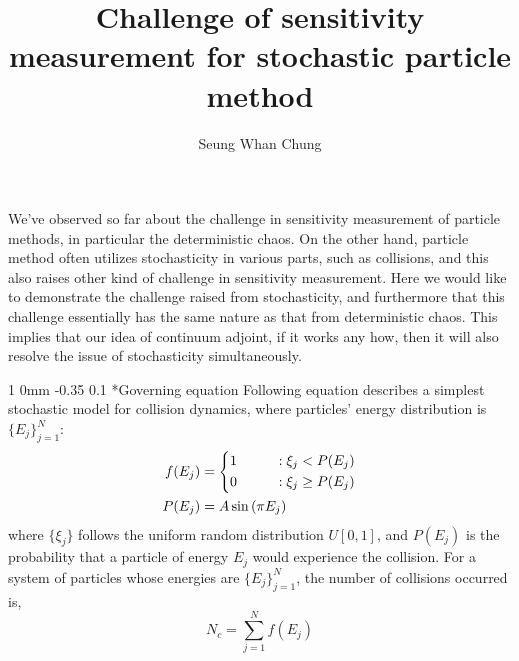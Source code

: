 \documentclass[11pt]{article}
\title{Challenge of sensitivity measurement for stochastic particle method}
\author{Seung Whan Chung}
\makeatletter
\renewcommand{\subsection}{\@startsection
{subsection}%
{1}%
{0mm}%
{-0.35\baselineskip}%
{0.1\baselineskip}%
{\normalfont\large\bfseries\color{brown}}}%
\makeatother
\begin{document}
\maketitle

We've observed so far about the challenge in sensitivity measurement of particle methods,
in particular the deterministic chaos.
On the other hand, particle method often utilizes stochasticity in various parts,
such as collisions,
and this also raises other kind of challenge in sensitivity measurement.
Here we would like to demonstrate the challenge raised from stochasticity,
and furthermore that this challenge essentially has the same nature as that from deterministic chaos.
This implies that our idea of continuum adjoint, if it works any how, then it will also resolve the issue of stochasticity simultaneously.
\subsection*{Governing equation}
Following equation describes a simplest stochastic model for collision dynamics,
where particles' energy distribution is $\{E_j\}_{j=1}^N$:
\begin{equation}
\begin{split}
f(E_j) &=
\begin{dcases}
1\qquad&: \xi_j < P(E_j)\\
0\qquad&: \xi_j \ge P(E_j)\\
\end{dcases}\\
P(E_j) &= A\sin\left( \pi E_j \right)
\label{e1}
\end{split}
\end{equation}
where $\{\xi_j\}$ follows the uniform random distribution $U[0,1]$,
and $P(E_j)$ is the probability that a particle of energy $E_j$ would experience the collision.
For a system of particles whose energies are $\{E_j\}_{j=1}^{N}$,
the number of collisions occurred is,
\begin{equation*}
N_c = \sum_{j=1}^{N} f(E_j)
\end{equation*}
\end{document}
